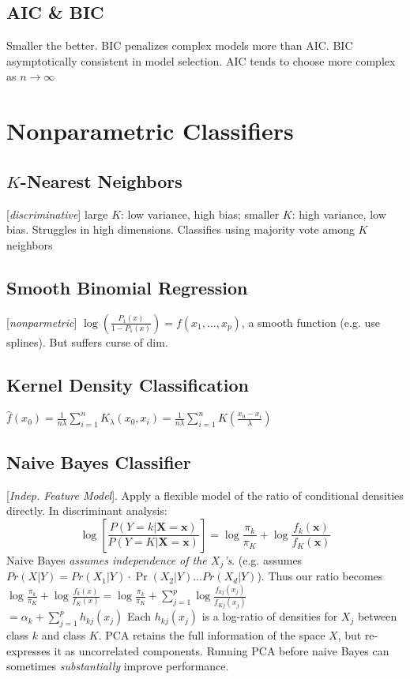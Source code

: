 \documentclass[9pt]{article}
\theoremstyle{definition}
\begin{document}
\begin{multicols}{2}
\subsection{AIC \& BIC}
Smaller the better.  BIC penalizes complex models more than AIC. BIC asymptotically consistent in model selection. AIC tends to choose more complex as $n\rightarrow\infty$

\section{Nonparametric Classifiers}
\subsection{$K$-Nearest Neighbors}
[\textit{discriminative}] large $K$: low variance, high bias; smaller $K$: high variance, low bias. Struggles in high dimensions.  Classifies using majority vote among $K$ neighbors
\subsection{Smooth Binomial Regression}
[\textit{nonparmetric}] $\log\left(\frac{P_1(x)}{1-P_1(x)}\right) = f(x_1,\dots,x_p)$, a smooth function (e.g. use splines).  But suffers curse of dim.
\subsection{Kernel Density Classification}
$\hat f(x_0) = \frac{1}{n\lambda}\sum_{i=1}^n K_\lambda(x_0,x_i) = \frac{1}{n\lambda}\sum_{i=1}^n K\left(\frac{x_0-x_i}{\lambda}\right)$
\subsection{Naive Bayes Classifier}
[\textit{Indep. Feature Model}].  Apply a flexible model of the ratio of conditional densities directly. In discriminant analysis:
\[
    \log\left[\frac{P(Y=k|\mathbf{X}=\mathbf{x})}{P(Y=K|\mathbf{X}=\mathbf{x})}\right]
    = \log\frac{\pi_k}{\pi_K} + \log\frac{f_k(\mathbf{x})}{f_K(\mathbf{x})}
\]
Naive Bayes \textit{assumes independence of the $X_j$'s}.  (e.g. assumes $Pr(X|Y) = Pr(X_1|Y)\cdot\Pr(X_2|Y)\dots Pr(X_d|Y)$).  Thus our ratio becomes
${\displaystyle 
    \log\frac{\pi_k}{\pi_K} + \log\frac{f_k(x)}{f_K(x)}  = \log\frac{\pi_k}{\pi_K} + \sum_{j=1}^p\log\frac{f_{kj}(x_j)}{f_{Kj}(x_j)}}$ \\
    ${\displaystyle = \alpha_k + \sum_{j=1}^p h_{kj}(x_j)
}$ \quad
Each $h_{kj}(x_j)$ is a log-ratio of densities for $X_j$ between class $k$ and class $K$.  PCA retains the full information of the space $X$, but re-expresses it as uncorrelated components.  Running PCA before naive Bayes can sometimes \textit{substantially} improve performance.

\end{multicols}
\end{document}
